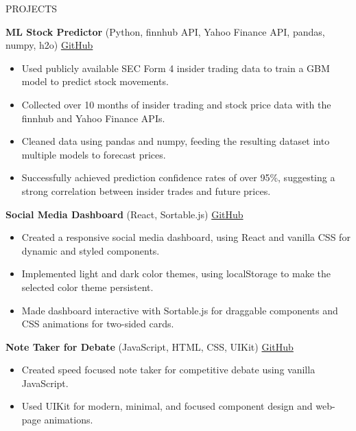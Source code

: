 \documentclass{resume} %
\begin{document}
\begin{rSection}{PROJECTS}
    \vspace{-1.25em}
    \item \textbf{ML Stock Predictor} {(Python, finnhub API, Yahoo Finance API, pandas, numpy, h2o)} \hfill \href{https://github.com/iandraves/InsiderAI}{GitHub}
    \begin{itemize}
        \itemsep -3pt {} 
        \item Used publicly available SEC Form 4 insider trading data to train a GBM model to predict stock movements.
        \item Collected over 10 months of insider trading and stock price data with the finnhub and Yahoo Finance APIs.
        \item Cleaned data using pandas and numpy, feeding the resulting dataset into multiple models to forecast prices.
        \item Successfully achieved prediction confidence rates of over 95\%, suggesting a strong correlation between insider trades and future prices. 
    \end{itemize}
    \item \textbf{Social Media Dashboard} {(React, Sortable.js)} \hfill \href{https://github.com/iandraves/Dashli}{GitHub}
    \begin{itemize}
        \itemsep -3pt {} 
        \item Created a responsive social media dashboard, using React and vanilla CSS for dynamic and styled components.
        \item Implemented light and dark color themes, using localStorage to make the selected color theme persistent.
        \item Made dashboard interactive with Sortable.js for draggable components and CSS animations for two-sided cards.
    \end{itemize}
    \item \textbf{Note Taker for Debate} {(JavaScript, HTML, CSS, UIKit)} \hfill \href{https://github.com/iandraves/Droplet}{GitHub}
    \begin{itemize}
        \itemsep -3pt {} 
        \item Created speed focused note taker for competitive debate using vanilla JavaScript. 
        \item Used UIKit for modern, minimal, and focused component design and web-page animations.

\end{itemize}
\end{rSection}
\end{document}
